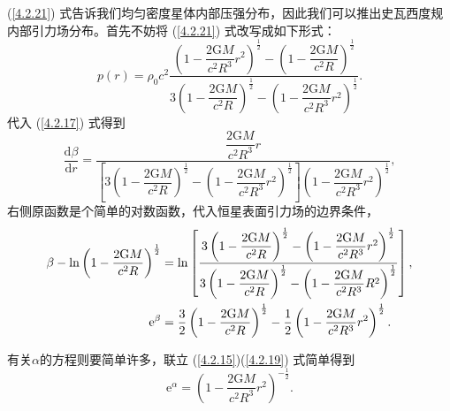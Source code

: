 \documentclass[11pt, a4paper, oneside, onecolumn]{ctexart}
\numberwithin{equation}{subsection}
\begin{document}
(\ref{4.2.21}) 式告诉我们均匀密度星体内部压强分布，因此我们可以推出史瓦西度规内部引力场分布。首先不妨将 (\ref{4.2.21}) 式改写成如下形式：
\begin{equation}
p\left(r\right)=\rho_{0}c^{2}\frac{\left(1-\dfrac{2\mathrm{G}M}{c^{2}R^{3}}r^{2}\right)^{\frac{1}{2}}-\left(1-\dfrac{2\mathrm{G}M}{c^{2}R}\right)^{\frac12}}{3\left(1-\dfrac{2\mathrm{G}M}{c^{2}R}\right)^{\frac12}-\left(1-\dfrac{2\mathrm{G}M}{c^{2}R^{3}}r^{2}\right)^{\frac{1}{2}}}.
\end{equation}
代入 (\ref{4.2.17}) 式得到
\begin{equation}
\frac{\mathrm{d}\beta}{\mathrm{d}r}=\frac{\dfrac{2\mathrm{G}M}{c^{2}R^{3}}r}{\left[3\left(1-\dfrac{2\mathrm{G}M}{c^{2}R}\right)^{\frac12}-\left(1-\dfrac{2\mathrm{G}M}{c^{2}R^{3}}r^{2}\right)^{\frac{1}{2}}\right]\left(1-\dfrac{2\mathrm{G}M}{c^{2}R^{3}}r^{2}\right)^{\frac{1}{2}}},
\end{equation}
右侧原函数是个简单的对数函数，代入恒星表面引力场的边界条件，
\begin{align}
\beta-\ln\left(1-\frac{2\mathrm{G}M}{c^{2}R}\right)^{\frac{1}{2}}&=\ln\left[\dfrac{3\left(1-\dfrac{2\mathrm{G}M}{c^{2}R}\right)^{\frac12}-\left(1-\dfrac{2\mathrm{G}M}{c^{2}R^{3}}r^{2}\right)^{\frac{1}{2}}}{3\left(1-\dfrac{2\mathrm{G}M}{c^{2}R}\right)^{\frac12}-\left(1-\dfrac{2\mathrm{G}M}{c^{2}R^{3}}R^{2}\right)^{\frac{1}{2}}}\right],\notag\\
\mathrm{e}^{\beta}&=\frac{3}{2}\left(1-\dfrac{2\mathrm{G}M}{c^{2}R}\right)^{\frac12}-\frac{1}{2}\left(1-\dfrac{2\mathrm{G}M}{c^{2}R^{3}}r^{2}\right)^{\frac{1}{2}}.
\end{align}

有关$\alpha$的方程则要简单许多，联立 (\ref{4.2.15})(\ref{4.2.19}) 式简单得到
\begin{equation}
\mathrm{e}^{\alpha}=\left(1-\frac{2\mathrm{G}M}{c^{2}R^{3}}r^{2}\right)^{-\frac{1}{2}}.
\end{equation}
\end{document}
